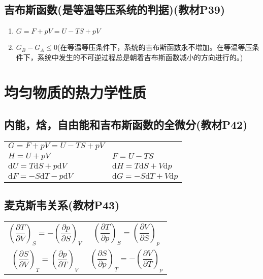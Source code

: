 \documentclass[oneside]{ctexbook}
\begin{document}
\section{吉布斯函数(是等温等压系统的判据)(教材P39)}
\begin{enumerate}
    \item \(G=F+pV=U-TS+pV\)
    \item \(G_B-G_A\leq{}0\)(在等温等压条件下，系统的吉布斯函数永不增加。在等温等压条件下，系统中发生的不可逆过程总是朝着吉布斯函数减小的方向进行的。)
\end{enumerate}

\chapter{均匀物质的热力学性质}

\section{内能，焓，自由能和吉布斯函数的全微分(教材P42)}
\begin{table}[h]
    \centering
    \begin{tabular}{ll}
        \(G=F+pV=U-TS+pV\)& \\
        \(H=U+pV\)&\(F=U-TS\) \\
        \(\mathrm{d}U=T\mathrm{d}S+p\mathrm{d}V\)&\(\mathrm{d}H=T\mathrm{d}S+V\mathrm{d}p\)\\
        \(\mathrm{d}F=-S\mathrm{d}T-p\mathrm{d}V\)&\(\mathrm{d}G=-S\mathrm{d}T+V\mathrm{d}p\)
    \end{tabular}
\end{table}

\section{麦克斯韦关系(教材P43)}
\begin{table}[h]
    \centering
    \begin{tabular}{cc}
        \(\left(\dfrac{\partial{}T}{\partial{}V}\right)_S=-\left(\dfrac{\partial{}p}{\partial{}S}\right)_V\)&\(\left(\dfrac{\partial{}T}{\partial{}p}\right)_S=\left(\dfrac{\partial{}V}{\partial{}S}\right)_p\)\\
        \(\left(\dfrac{\partial{}S}{\partial{}V}\right)_T=\left(\dfrac{\partial{}p}{\partial{}T}\right)_V\)&\(\left(\dfrac{\partial{}S}{\partial{}p}\right)_T=-\left(\dfrac{\partial{}V}{\partial{}T}\right)_p\) 
\end{tabular}
\end{table}
\end{document}
